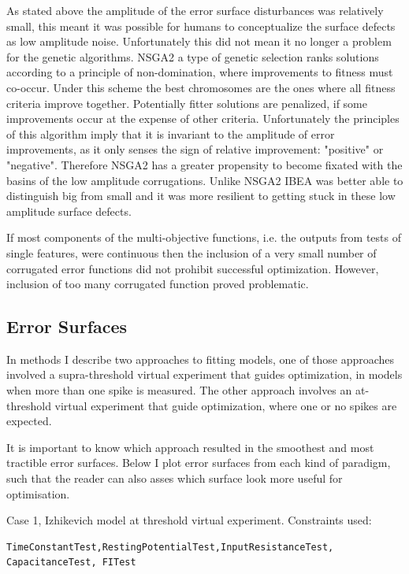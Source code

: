 As stated above the amplitude of the error surface disturbances was relatively small, this meant it was possible for humans to conceptualize the surface defects as low amplitude noise.
Unfortunately this did not mean it no longer a problem for the genetic algorithms. NSGA2 a type of genetic selection  ranks solutions according to a principle of non-domination, where improvements to fitness must co-occur. Under this scheme the best chromosomes are the ones where all fitness criteria improve together. Potentially fitter solutions are penalized, if some improvements occur at the expense of other criteria. Unfortunately the principles of this algorithm imply that it is invariant to the amplitude of error improvements, as it only senses the sign of relative improvement: "positive" or "negative". Therefore NSGA2 has a greater propensity to become fixated with the basins of the low amplitude corrugations. Unlike NSGA2 IBEA was better able to distinguish big from small and it was more resilient to getting stuck in these low amplitude surface defects. 


If most components of the multi-objective functions, i.e. the outputs from tests of single features, were continuous then the inclusion of a very small number of corrugated error functions did not prohibit successful optimization.
However, inclusion of too many corrugated function proved problematic.

\subsection{Error Surfaces}
In methods I describe two approaches to fitting models, one of those approaches involved a supra-threshold virtual experiment that guides optimization, in models when more than one spike is measured. The other approach involves an at-threshold virtual experiment that guide optimization, where one or no spikes are expected.

It is important to know which approach resulted in the smoothest and most tractible error surfaces. Below I plot error surfaces from each kind of paradigm, such that the reader can also asses which surface look more useful for optimisation. 

Case 1, Izhikevich model at threshold virtual experiment. Constraints used:
\begin{verbatim}
TimeConstantTest,RestingPotentialTest,InputResistanceTest, CapacitanceTest, FITest
\end{verbatim}

